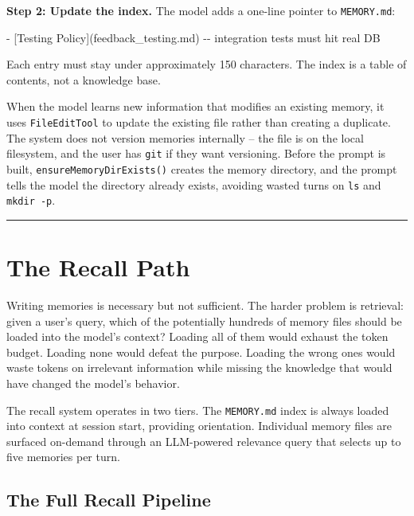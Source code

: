 \documentclass[
  english,
  11pt,
  letterpaper,
]{book}
\newenvironment{Shaded}{\begin{snugshade}}{\end{snugshade}}
\newcommand{\CommentTok}[1]{\textcolor[rgb]{0.37,0.37,0.37}{#1}}
\newcommand{\NormalTok}[1]{\textcolor[rgb]{0.00,0.23,0.31}{#1}}
\newcommand{\OtherTok}[1]{\textcolor[rgb]{0.00,0.23,0.31}{#1}}
\newcommand{\SpecialStringTok}[1]{\textcolor[rgb]{0.13,0.47,0.30}{#1}}
\begin{document}
\textbf{Step 2: Update the index.} The model adds a one-line pointer to
\texttt{MEMORY.md}:

\begin{Shaded}
\begin{Highlighting}[]
\SpecialStringTok{{-} }\CommentTok{[}\OtherTok{Testing Policy}\CommentTok{](feedback\_testing.md)}\NormalTok{ {-}{-} integration tests must hit real DB}
\end{Highlighting}
\end{Shaded}

Each entry must stay under approximately 150 characters. The index is a
table of contents, not a knowledge base.

When the model learns new information that modifies an existing memory,
it uses \texttt{FileEditTool} to update the existing file rather than
creating a duplicate. The system does not version memories internally --
the file is on the local filesystem, and the user has \texttt{git} if
they want versioning. Before the prompt is built,
\texttt{ensureMemoryDirExists()} creates the memory directory, and the
prompt tells the model the directory already exists, avoiding wasted
turns on \texttt{ls} and \texttt{mkdir\ -p}.

\begin{center}\rule{0.5\linewidth}{0.5pt}\end{center}

\section{The Recall Path}\label{the-recall-path}

Writing memories is necessary but not sufficient. The harder problem is
retrieval: given a user's query, which of the potentially hundreds of
memory files should be loaded into the model's context? Loading all of
them would exhaust the token budget. Loading none would defeat the
purpose. Loading the wrong ones would waste tokens on irrelevant
information while missing the knowledge that would have changed the
model's behavior.

The recall system operates in two tiers. The \texttt{MEMORY.md} index is
always loaded into context at session start, providing orientation.
Individual memory files are surfaced on-demand through an LLM-powered
relevance query that selects up to five memories per turn.

\subsection{The Full Recall Pipeline}\label{the-full-recall-pipeline}
\end{document}
